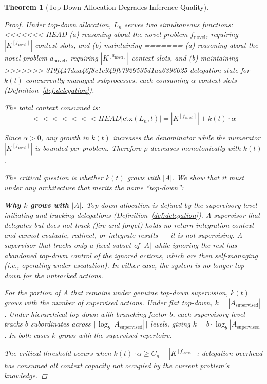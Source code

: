 \documentclass[11pt]{article}
\newtheorem{theorem}{Theorem}
\theoremstyle{definition}
\begin{document}
\begin{theorem}[Top-Down Allocation Degrades Inference Quality]
\begin{proof}
Under top-down allocation, $L_n$ serves two simultaneous functions:
<<<<<<< HEAD
(a) reasoning about the novel problem $f_{\mathrm{novel}}$, requiring
$|K^{[f_{\mathrm{novel}}]}|$ context slots, and (b) maintaining
=======
(a) reasoning about the novel problem $a_{\mathrm{novel}}$, requiring
$|K^{[a_{\mathrm{novel}}]}|$ context slots, and (b) maintaining
>>>>>>> 319f447daa46f8c1e949fb7929535d1aa6396025
delegation state for $k(t)$ concurrently managed subprocesses, each
consuming $\alpha$ context slots (Definition~\ref{def:delegation}).

The total context consumed is:
\[
<<<<<<< HEAD
|\mathrm{ctx}(L_n, t)| = |K^{[f_{\mathrm{novel}}]}| + k(t) \cdot \alpha
\]

Since $\alpha > 0$, any growth in $k(t)$ increases the denominator
while the numerator $|K^{[f_{\mathrm{novel}}]}|$ is bounded per
problem. Therefore $\rho$ decreases monotonically with $k(t)$.

The critical question is whether $k(t)$ grows with $|A|$. We show that
it must under any architecture that merits the name ``top-down'':

\textbf{Why $k$ grows with $|A|$.} Top-down allocation is defined by
the supervisory level \emph{initiating} and \emph{tracking}
delegations (Definition~\ref{def:delegation}). A supervisor that
delegates but does not track (fire-and-forget) holds no return-integration context and
cannot evaluate, redirect, or integrate results --- it is not
supervising. A supervisor that tracks only a fixed subset of $|A|$
while ignoring the rest has abandoned top-down control of the
ignored actions, which are then self-managing (i.e., operating under
escalation). In either case, the system is no longer top-down for the
untracked actions.

For the portion of $A$ that remains under genuine top-down
supervision, $k(t)$ grows with the number of supervised actions. Under
flat top-down, $k = |A_{\text{supervised}}|$. Under hierarchical
top-down with branching factor $b$, each supervisory level tracks $b$
subordinates across $\lceil \log_b |A_{\text{supervised}}| \rceil$
levels, giving $k = b \cdot \log_b |A_{\text{supervised}}|$. In both
cases $k$ grows with the supervised repertoire.

The critical threshold occurs when $k(t) \cdot \alpha \geq C_n -
|K^{[f_{\mathrm{novel}}]}|$: delegation overhead has consumed all
context capacity not occupied by the current problem's knowledge.


\end{proof}
\end{theorem}
\end{document}

